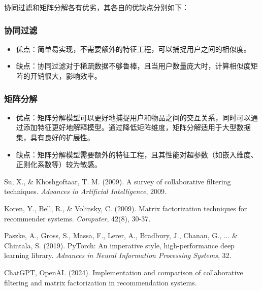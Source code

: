 \documentclass[12pt]{ctexart}
\begin{document}
协同过滤和矩阵分解各有优劣，其各自的优缺点分别如下：

\subsubsection*{协同过滤}

\begin{itemize}
    \item 优点：简单易实现，不需要额外的特征工程，可以捕捉用户之间的相似度。
    \item 缺点：协同过滤对于稀疏数据不够鲁棒，且当用户数量庞大时，计算相似度矩阵的开销很大，影响效率。
\end{itemize}

\subsubsection*{矩阵分解}

\begin{itemize}
    \item 优点：矩阵分解模型可以更好地捕捉用户和物品之间的交互关系，同时可以通过添加特征更好地解释模型。通过降低矩阵维度，矩阵分解适用于大型数据集，具有良好的扩展性。
    \item 缺点：矩阵分解模型需要额外的特征工程，且其性能对超参数（如嵌入维度、正则化系数等）较为敏感。
\end{itemize}



\newpage

\begin{thebibliography}{9}
    Su, X., \& Khoshgoftaar, T. M. (2009). A survey of collaborative filtering techniques. \textit{Advances in Artificial Intelligence}, 2009.
    
    Koren, Y., Bell, R., \& Volinsky, C. (2009). Matrix factorization techniques for recommender systems. \textit{Computer}, 42(8), 30-37.
    
    Paszke, A., Gross, S., Massa, F., Lerer, A., Bradbury, J., Chanan, G., ... \& Chintala, S. (2019). PyTorch: An imperative style, high-performance deep learning library. \textit{Advances in Neural Information Processing Systems}, 32.
    
    ChatGPT, OpenAI. (2024). Implementation and comparison of collaborative filtering and matrix factorization in recommendation systems.
\end{thebibliography}
\end{document}
